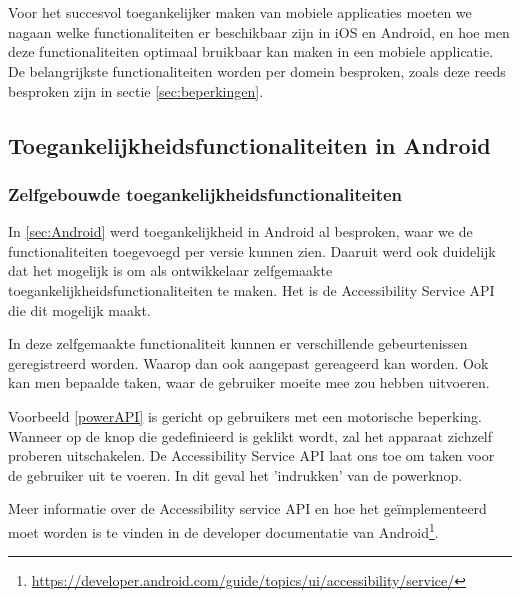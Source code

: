 \chapter{}
\label{ch:Functionaliteiten in Android en iOS}
Voor het succesvol toegankelijker maken van mobiele applicaties moeten we nagaan welke functionaliteiten er beschikbaar zijn in iOS en Android, en hoe men deze functionaliteiten optimaal  bruikbaar kan maken in een mobiele applicatie. De belangrijkste functionaliteiten worden per domein besproken, zoals deze reeds besproken zijn in sectie \ref{sec:beperkingen}.
\section{Toegankelijkheidsfunctionaliteiten in Android}
\label{sec:ToegankelijkheidsfunctionaliteitenAndroid}
\subsection{Zelfgebouwde toegankelijkheidsfunctionaliteiten}
In \ref{sec:Android} werd toegankelijkheid in Android al besproken, waar we de functionaliteiten toegevoegd per versie kunnen zien. Daaruit werd ook duidelijk dat het mogelijk is om als ontwikkelaar zelfgemaakte toegankelijkheidsfunctionaliteiten te maken. Het is de Accessibility Service \gls{API} die dit mogelijk maakt. 

In deze zelfgemaakte functionaliteit kunnen er verschillende gebeurtenissen geregistreerd worden.  Waarop dan ook aangepast gereageerd kan worden. Ook kan men bepaalde taken, waar de gebruiker moeite mee zou hebben uitvoeren. 

Voorbeeld \ref{powerAPI} is gericht op gebruikers met een motorische beperking. Wanneer op de knop die gedefinieerd is geklikt wordt, zal het apparaat zichzelf proberen uitschakelen. De Accessibility Service \gls{API} laat ons toe om taken voor de gebruiker uit te voeren. In dit geval het 'indrukken' van de powerknop.

Meer informatie over de Accessibility service \gls{API} en hoe het geïmplementeerd moet worden is te vinden in de developer documentatie van Android\footnote{\url{https://developer.android.com/guide/topics/ui/accessibility/service/}}.

